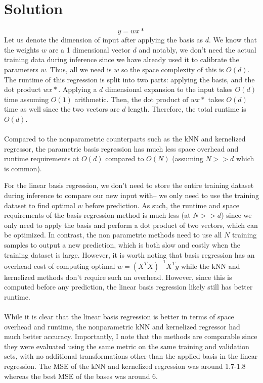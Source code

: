 \documentclass[submit]{../harvardml}
\newenvironment{solution}
  {\color{black}\section*{Solution}}
{}
\begin{document}
\begin{solution}
\begin{tcolorbox}
        $$y = wx*$$
        Let us denote the dimension of input after applying the basis as $d$. We know that the weights $w$ are a 1 dimensional vector $d$ and notably, we don't need the actual training data during inference since we have already used it to calibrate the parameters $w$. Thus, all we need is $w$ so the space complexity of this is $O(d)$. The runtime of this regression is split into two parts: applying the basis, and the dot product $wx*$. Applying a $d$ dimensional expansion to the input takes $O(d)$ time assuming $O(1)$ arithmetic. Then, the dot product of $wx*$ takes $O(d)$ time as well since the two vectors are $d$ length. Therefore, the total runtime is $O(d)$. 
        \\
        \\
        Compared to the nonparametric counterparts such as the kNN and kernelized regressor, the parametric basis regression has much less space overhead and runtime requirements at $O(d)$ compared to $O(N)$ (assuming $N >> d$ which is common). 
    \end{tcolorbox}
    \begin{tcolorbox}
        For the linear basis regression, we don't need to store the entire training dataset during inference to compare our new input with-- we only need to use the training dataset to find optimal $w$ before prediction. As such, the runtime and space requirements of the basis regression method is much less (at $N >> d$) since we only need to apply the basis and perform a dot product of two vectors, which can be optimized. In contrast, the non parametric methods need to use all $N$ training samples to output a new prediction, which is both slow and costly when the training dataset is large. However, it is worth noting that basis regression has an overhead cost of computing optimal $w = (X^TX)^{-1}X^Ty$ while the kNN and kernelized methods don't require such an overhead. However, since this is computed before any prediction, the linear basis regression likely still has better runtime. 
        \\
        \\
        While it is clear that the linear basis regression is better in terms of space overhead and runtime, the nonparametric kNN and kernelized regressor had much better accuracy. Importantly, I note that the methods are comparable since they were evaluated using the same metric on the same training and validation sets, with no additional transformations other than the applied basis in the linear regression. The MSE of the kNN and kernelized regression was around 1.7-1.8 whereas the best MSE of the bases was around 6.

\end{tcolorbox}
\end{solution}
\end{document}
